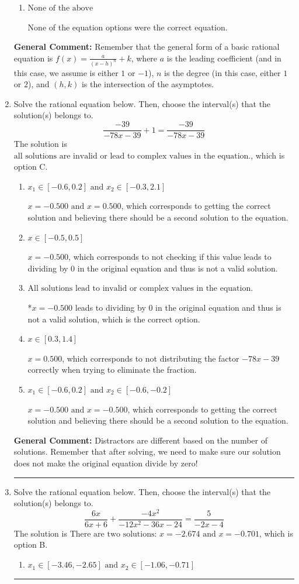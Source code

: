 \documentclass{extbook}[14pt]
\newcommand{\litem}[1]{\item #1

\rule{\textwidth}{0.4pt}}
\begin{document}
\begin{enumerate}
{\begin{enumerate}[label=\Alph*.]
Corresponds to thinking the graph was a shifted version of $\frac{1}{x}$ AND not noticing the $y$-value was wrong.
\item \( \text{None of the above} \)

None of the equation options were the correct equation.
\end{enumerate}

\textbf{General Comment:} Remember that the general form of a basic rational equation is $ f(x) = \frac{a}{(x-h)^n} + k$, where $a$ is the leading coefficient (and in this case, we assume is either $1$ or $-1$), $n$ is the degree (in this case, either $1$ or $2$), and $(h, k)$ is the intersection of the asymptotes.
}
\litem{
Solve the rational equation below. Then, choose the interval(s) that the solution(s) belongs to.
\[ \frac{-39}{-78x -39} + 1 = \frac{-39}{-78x -39} \]The solution is \( \text{all solutions are invalid or lead to complex values in the equation.} \), which is option C.\begin{enumerate}[label=\Alph*.]
\item \( x_1 \in [-0.6, 0.2] \text{ and } x_2 \in [-0.3,2.1] \)

$x = -0.500 \text{ and } x = 0.500$, which corresponds to getting the correct solution and believing there should be a second solution to the equation.
\item \( x \in [-0.5,0.5] \)

$x = -0.500$, which corresponds to not checking if this value leads to dividing by 0 in the original equation and thus is not a valid solution.
\item \( \text{All solutions lead to invalid or complex values in the equation.} \)

*$x = -0.500$ leads to dividing by 0 in the original equation and thus is not a valid solution, which is the correct option.
\item \( x \in [0.3,1.4] \)

$x = 0.500$, which corresponds to not distributing the factor $-78x -39$ correctly when trying to eliminate the fraction.
\item \( x_1 \in [-0.6, 0.2] \text{ and } x_2 \in [-0.6,-0.2] \)

$x = -0.500 \text{ and } x = -0.500$, which corresponds to getting the correct solution and believing there should be a second solution to the equation.
\end{enumerate}

\textbf{General Comment:} Distractors are different based on the number of solutions. Remember that after solving, we need to make sure our solution does not make the original equation divide by zero!
}
\litem{
Solve the rational equation below. Then, choose the interval(s) that the solution(s) belongs to.
\[ \frac{6x}{6x + 6} + \frac{-4x^{2}}{-12x^{2} -36 x -24} = \frac{5}{-2x -4} \]The solution is \( \text{There are two solutions: } x = -2.674 \text{ and } x = -0.701 \), which is option B.\begin{enumerate}[label=\Alph*.]
\item \( x_1 \in [-3.46, -2.65] \text{ and } x_2 \in [-1.06,-0.71] \)



\end{enumerate}}
\end{enumerate}
\end{document}
